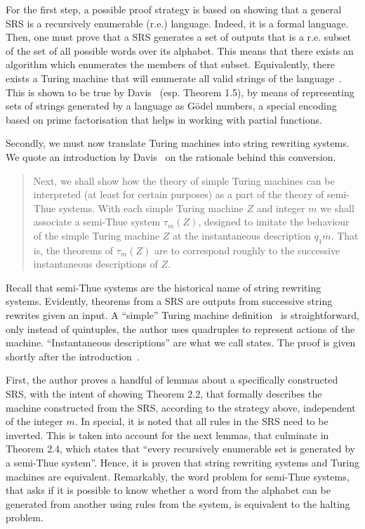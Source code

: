 \documentclass[12pt]{article}
\begin{document}
For the first step, a possible proof strategy is based on showing that a general SRS is a recursively enumerable (r.e.) language. Indeed, it is a formal language. Then, one must prove that a SRS generates a set of outputs that is a r.e. subset of the set of all possible words over its alphabet. This means that there exists an algorithm which enumerates the members of that subset. Equivalently, there exists a Turing machine that will enumerate all valid strings of the language~\cite{}. This is shown to be true by Davis~\cite[pp. 84--86]{} (esp. Theorem 1.5), by means of representing sets of strings generated by a language as Gödel numbers, a special encoding based on prime factorisation that helps in working with partial functions.

Secondly, we must now translate Turing machines into string rewriting systems. We quote an introduction by Davis~\cite[Sec. 6.2]{} on the rationale behind this conversion.

\begin{quote}
    Next, we shall show how the theory of simple Turing machines can be interpreted (at least for certain purposes) as a part of the theory of semi-Thue systems. With each simple Turing machine $Z$ and integer $m$ we shall associate a semi-Thue system $\tau_{m}(Z)$, designed to imitate the behaviour of the simple Turing machine $Z$ at the instantaneous description $q_{1}\overline{m}$. That is, the theorems of $\tau_{m}(Z)$ are to correspond roughly to the successive instantaneous descriptions of $Z$.
\end{quote}

Recall that semi-Thue systems are the historical name of string rewriting systems. Evidently, theorems from a SRS are outputs from successive string rewrites given an input. A ``simple'' Turing machine definition~\cite[Sec. 1.1, Def. 1.3]{} is straightforward, only instead of quintuples, the author uses quadruples to represent actions of the machine. ``Instantaneous descriptions'' are what we call states. The proof is given shortly after the introduction~\cite[pp. 88--93]{}. 

First, the author proves a handful of lemmas about a specifically constructed SRS, with the intent of showing Theorem 2.2, that formally describes the machine constructed from the SRS, according to the strategy above, independent of the integer $m$. In special, it is noted that all rules in the SRS need to be inverted. This is taken into account for the next lemmas, that culminate in Theorem 2.4, which states that ``every recursively enumerable set is generated by a semi-Thue system''. Hence, it is proven that string rewriting systems and Turing machines are equivalent. Remarkably, the word problem for semi-Thue systems, that asks if it is possible to know whether a word from the alphabet can be generated from another using rules from the system, is equivalent to the halting problem.
\end{document}
